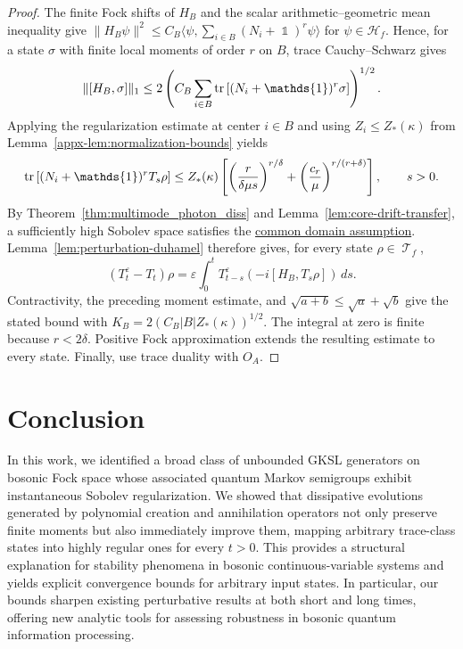 \documentclass[11pt]{article}
\theoremstyle{myplain}
\theoremstyle{mydefinition}
\theoremstyle{remark}
\DeclareMathOperator{\cT}{\mathcal{T}}
\DeclareMathOperator{\1}{\mathds{1}}
\newcommand{\tr}[1][]{\operatorname{tr}%
  \ifx#1\empty \else \left[ #1 \right] \fi}
\begin{document}
        \begin{proof}
            
            The finite Fock shifts of $H_B$ and the scalar arithmetic--geometric mean inequality give $\|H_B\psi\|^2 \le C_B\langle\psi,\sum_{i\in B}(N_i + \1)^r\psi\rangle$ for $\psi \in \mathcal H_f$. Hence, for a state $\sigma$ with finite local moments of order $r$ on $B$, trace Cauchy--Schwarz gives
            \begin{equation}
                \|[H_B,\sigma]\|_1\le2\left(C_B\sum_{i\in B}\tr[(N_i+\1)^r\sigma]\right)^{1/2}.
            \end{equation}
            Applying the regularization estimate at center $i \in B$ and using $Z_i \le Z_*(\kappa)$ from Lemma~\ref{appx-lem:normalization-bounds} yields
            \begin{equation}
                \tr[(N_i+\1)^rT_s\rho]
                \le Z_*(\kappa)\left[\left(\frac{r}{\delta\mu s}\right)^{r/\delta}
                +\left(\frac{c_r}{\mu}\right)^{r/(r+\delta)}\right],\qquad s > 0.
            \end{equation}
            By Theorem~\ref{thm:multimode_photon_diss} and Lemma~\ref{lem:core-drift-transfer}, a sufficiently high Sobolev space satisfies the \hyperref[assum:perturbation-common-domain]{common domain assumption}. Lemma~\ref{lem:perturbation-duhamel} therefore gives, for every state $\rho \in \cT_f$,
            \begin{equation}
                (T_t^\varepsilon-T_t)\rho
                =\varepsilon\int_0^tT_{t-s}^\varepsilon(-i[H_B,T_s\rho])\,ds.
            \end{equation}
            Contractivity, the preceding moment estimate, and $\sqrt{a+b}\le\sqrt a+\sqrt b$ give the stated bound with $K_B=2(C_B|B|Z_*(\kappa))^{1/2}$. The integral at zero is finite because $r<2\delta$. Positive Fock approximation extends the resulting estimate to every state. Finally, use trace duality with $O_A$.
            
        \end{proof}


\section{Conclusion}\label{sec:conclusion}
    In this work, we identified a broad class of unbounded GKSL generators on bosonic Fock space whose associated quantum Markov semigroups exhibit instantaneous Sobolev regularization. We showed that dissipative evolutions generated by polynomial creation and annihilation operators not only preserve finite moments but also immediately improve them, mapping arbitrary trace-class states into highly regular ones for every $t>0$. This provides a structural explanation for stability phenomena in bosonic continuous-variable systems and yields explicit convergence bounds for arbitrary input states. In particular, our bounds sharpen existing perturbative results at both short and long times, offering new analytic tools for assessing robustness in bosonic quantum information processing.
\end{document}
